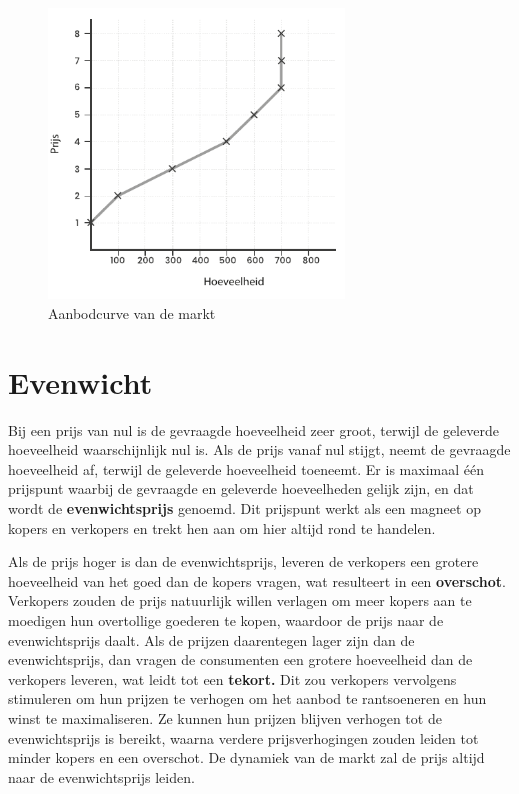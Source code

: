 \begin{figure}[H]
\centering
    \includegraphics[width=0.7\textwidth]{figures/fig25.pdf}
    \caption[Aanbodcurve van de markt]{Aanbodcurve van de markt}
    \label{fig25}
\end{figure}

\clearpage
\hypertarget{evenwicht}{%
\section{Evenwicht}\label{evenwicht}}

Bij een prijs van nul is de gevraagde hoeveelheid zeer groot, terwijl de geleverde hoeveelheid waarschijnlijk nul is. Als de prijs vanaf nul stijgt, neemt de gevraagde hoeveelheid af, terwijl de geleverde hoeveelheid toeneemt. Er is maximaal één prijspunt waarbij de gevraagde en geleverde hoeveelheden gelijk zijn, en dat wordt de \textbf{evenwichtsprijs} genoemd. Dit prijspunt werkt als een magneet op kopers en verkopers en trekt hen aan om hier altijd rond te handelen.

Als de prijs hoger is dan de evenwichtsprijs, leveren de verkopers een grotere hoeveelheid van het goed dan de kopers vragen, wat resulteert in een \textbf{overschot}. Verkopers zouden de prijs natuurlijk willen verlagen om meer kopers aan te moedigen hun overtollige goederen te kopen, waardoor de prijs naar de evenwichtsprijs daalt. Als de prijzen daarentegen lager zijn dan de evenwichtsprijs, dan vragen de consumenten een grotere hoeveelheid dan de verkopers leveren, wat leidt tot een \textbf{tekort.} Dit zou verkopers vervolgens stimuleren om hun prijzen te verhogen om het aanbod te rantsoeneren en hun winst te maximaliseren. Ze kunnen hun prijzen blijven verhogen tot de evenwichtsprijs is bereikt, waarna verdere prijsverhogingen zouden leiden tot minder kopers en een overschot. De dynamiek van de markt zal de prijs altijd naar de evenwichtsprijs leiden.

